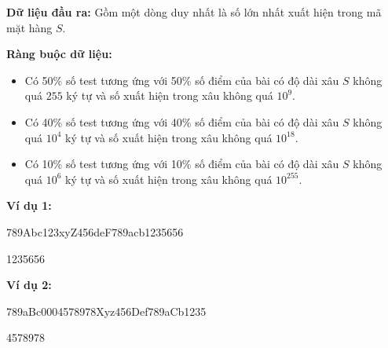 \documentclass[12pt]{scrartcl}  %
\begin{document}
\textbf{Dữ liệu đầu ra:}
Gồm một dòng duy nhất là số lớn nhất xuất hiện trong mã mặt hàng $S$.

\textbf{Ràng buộc dữ liệu:}
\begin{itemize}
    \item Có 50\% số test tương ứng với 50\% số điểm của bài có độ dài xâu $S$ không quá $255$ ký tự và số xuất hiện trong xâu không quá $10^9$.
    \item Có 40\% số test tương ứng với 40\% số điểm của bài có độ dài xâu $S$ không quá $10^4$ ký tự và số xuất hiện trong xâu không quá $10^{18}$.
    \item Có 10\% số test tương ứng với 10\% số điểm của bài có độ dài xâu $S$ không quá $10^6$ ký tự và số xuất hiện trong xâu không quá $10^{255}$.
\end{itemize}

\textbf{Ví dụ 1:}
\begin{tcolorbox}[colback=gray!5!white, colframe=blue!50!black, title=Input]
789Abc123xyZ456deF789acb1235656
\end{tcolorbox}
\begin{tcolorbox}[colback=gray!5!white, colframe=green!50!black, title=Output]
1235656
\end{tcolorbox}

\textbf{Ví dụ 2:}
\begin{tcolorbox}[colback=gray!5!white, colframe=blue!50!black, title=Input]
789aBc0004578978Xyz456Def789aCb1235
\end{tcolorbox}
\begin{tcolorbox}[colback=gray!5!white, colframe=green!50!black, title=Output]
4578978
\end{tcolorbox}
\end{document}
